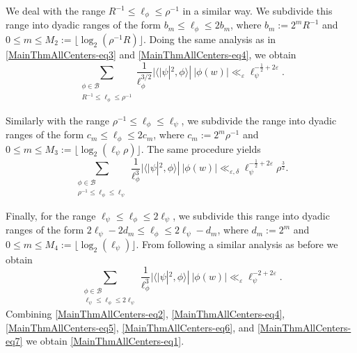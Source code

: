 \documentclass[11pt]{amsart}
\theoremstyle{definition}
\begin{document}
We deal with the range $R^{-1} \leq \ell_{\phi} \leq \rho^{-1}$ in a similar way. We subdivide this range into dyadic ranges of the form $b_{m} \leq \ell_{\phi} \leq 2b_{m}$, where $b_{m} := 2^{m}R^{-1}$ and $0\leq m \leq M_2 := \lfloor \log_{2}(\rho^{-1} R) \rfloor$. Doing the same analysis as in \eqref{MainThmAllCenters-eq3} and \eqref{MainThmAllCenters-eq4}, we obtain 
\begin{equation}
    \sum_{\substack{\phi \in \mathcal{B} \\ R^{-1} \leq \ell_{\phi} \leq \rho^{-1}}} \frac{1}{\ell_{\phi}^{3/2}} |\langle |\psi|^2, \phi\rangle | \: |\phi(w)| \ll_{\varepsilon} \ell_{\psi}^{- \frac{1}{2} + 2\varepsilon}. \label{MainThmAllCenters-eq5}
\end{equation}

Similarly with the range $\rho^{-1} \leq \ell_{\phi} \leq \ell_{\psi}$, we subdivide the range into dyadic ranges of the form $c_m \leq \ell_{\phi} \leq 2c_m$, where $c_m := 2^{m} \rho^{-1}$ and $0\leq m\leq M_3 := \lfloor \log_{2}(\ell_{\psi} \rho ) \rfloor$. The same procedure yields 
\begin{equation}
    \sum_{\substack{\phi \in \mathcal{B} \\ \rho^{-1} \leq \ell_{\phi} \leq \ell_{\psi}}} \frac{1}{\ell_{\phi}^{3}} |\langle |\psi|^2, \phi\rangle | \: |\phi(w)| \ll_{\varepsilon, \delta} \ell_{\psi}^{-\frac{1}{2} + 2\varepsilon} \rho^{\frac{3}{2}}. \label{MainThmAllCenters-eq6}
\end{equation}

Finally, for the range $\ell_{\psi} \leq \ell_{\phi} \leq 2\ell_{\psi}$, we subdivide this range into dyadic ranges of the form $2\ell_{\psi} - 2d_{m} \leq \ell_{\phi} \leq 2\ell_{\psi} - d_{m}$, where $d_{m} := 2^{m}$ and $0\leq m \leq M_4 := \lfloor \log_{2}(\ell_{\psi}) \rfloor$. From following a similar analysis as before we obtain
\begin{equation}
    \sum_{\substack{\phi \in \mathcal{B} \\ \ell_{\psi} \leq \ell_{\phi} \leq 2\ell_{\psi}}} \frac{1}{\ell_{\phi}^3} |\langle |\psi|^2, \phi\rangle | \: |\phi(w)| \ll_{\varepsilon} \ell_{\psi}^{-2+2\varepsilon}. \label{MainThmAllCenters-eq7}
\end{equation}
Combining \eqref{MainThmAllCenters-eq2}, \eqref{MainThmAllCenters-eq4}, \eqref{MainThmAllCenters-eq5}, \eqref{MainThmAllCenters-eq6}, and \eqref{MainThmAllCenters-eq7} we obtain \eqref{MainThmAllCenters-eq1}. 
\end{document}
